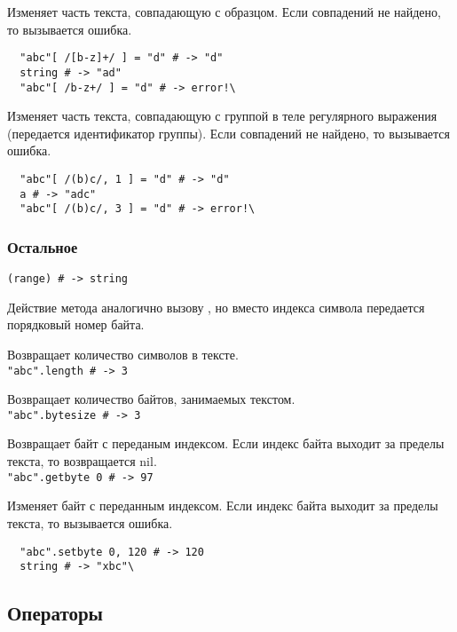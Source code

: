 \begin{methodlist}
  Изменяет часть текста, совпадающую с образцом. Если совпадений не найдено, то вызывается ошибка.
  \begin{verbatim}
  "abc"[ /[b-z]+/ ] = "d" # -> "d"
  string # -> "ad"
  "abc"[ /b-z+/ ] = "d" # -> error!\
  \end{verbatim}

  Изменяет часть текста, совпадающую с группой в теле регулярного выражения (передается идентификатор группы). Если совпадений не найдено, то вызывается ошибка.
  \begin{verbatim}
  "abc"[ /(b)c/, 1 ] = "d" # -> "d"
  a # -> "adc"
  "abc"[ /(b)c/, 3 ] = "d" # -> error!\
  \end{verbatim}
\end{methodlist}

\subsubsection*{Остальное}

\begin{methodlist}
  \verb!(range) # -> string!

  Действие метода аналогично вызову , но вместо индекса символа передается порядковый номер байта.

  \declare{.length}{\# -> integer}
  Возвращает количество символов в тексте.
  \\\verb!"abc".length # -> 3!

  Возвращает количество байтов, занимаемых текстом.
  \\\verb!"abc".bytesize # -> 3!

  Возвращает байт с переданым индексом. Если индекс байта выходит за пределы текста, то возвращается nil.
  \\\verb!"abc".getbyte 0 # -> 97!

  Изменяет байт с переданным индексом. Если индекс байта выходит за пределы текста, то вызывается ошибка.
  \begin{verbatim}
  "abc".setbyte 0, 120 # -> 120
  string # -> "xbc"\
  \end{verbatim}
\end{methodlist}


\subsection*{Операторы}

